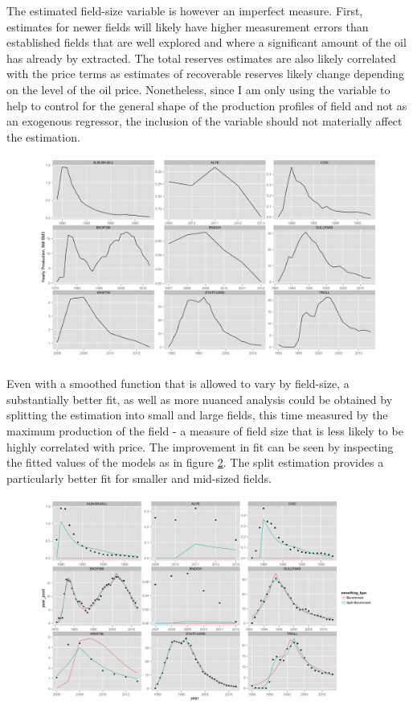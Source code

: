 \documentclass[12pt]{article}
\begin{document}
The estimated field-size variable is however an imperfect measure.  First, estimates for newer fields will likely have higher measurement errors than established fields that are well explored and where a significant amount of the oil has already by extracted.  The total reserves estimates are also likely correlated with the price terms as estimates of recoverable reserves likely change depending on the level of the oil price.  Nonetheless, since I am only using the variable to help to control for the general shape of the production profiles of field and not as an exogenous regressor, the inclusion of the variable should not materially affect the estimation.

\begin{figure}
	\includegraphics[width=1\textwidth]{figures/field_inspection_print.png}
	\caption{}
	\label{field_inspection}
\end{figure}

Even with a smoothed function that is allowed to vary by field-size, a substantially better fit, as well as more nuanced analysis could be obtained by splitting the estimation into small and large fields, this time measured by the maximum production of the field - a measure of field size that is less likely to be highly correlated with price.  The improvement in fit can be seen by inspecting the fitted values of the models as in figure \ref{bench_vs_split}. The split estimation provides a particularly better fit for smaller and mid-sized fields.

\begin{figure}
	\includegraphics[width=1\textwidth]{figures/bench_vs_split_print.png}
	\caption{}
	\label{bench_vs_split}
\end{figure}
\end{document}
